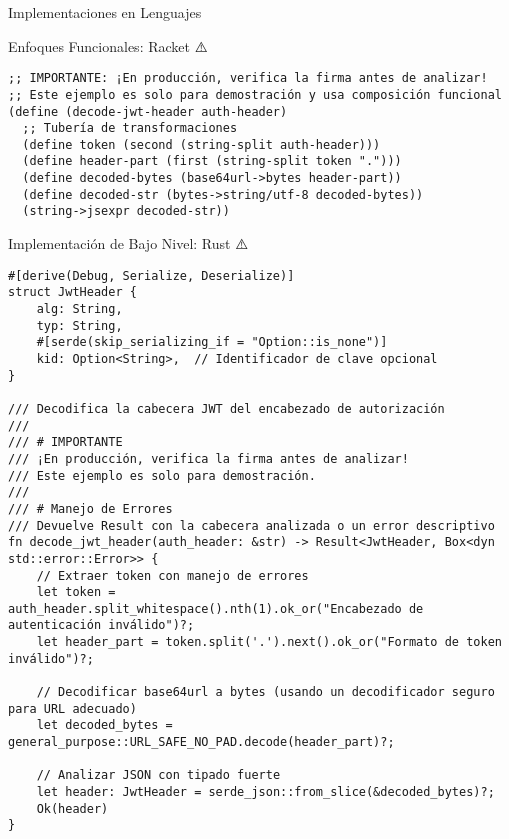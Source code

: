 \documentclass[presentation,aspectratio=169]{beamer}
\begin{document}
\begin{frame}[label={sec:orga7e0c44},fragile]{Implementaciones en Lenguajes}
\begin{block}{Enfoques Funcionales: Racket ⚠️}
\begin{verbatim}
;; IMPORTANTE: ¡En producción, verifica la firma antes de analizar!
;; Este ejemplo es solo para demostración y usa composición funcional
(define (decode-jwt-header auth-header)
  ;; Tubería de transformaciones
  (define token (second (string-split auth-header)))
  (define header-part (first (string-split token ".")))
  (define decoded-bytes (base64url->bytes header-part))
  (define decoded-str (bytes->string/utf-8 decoded-bytes))
  (string->jsexpr decoded-str))
\end{verbatim}
\end{block}
\begin{block}{Implementación de Bajo Nivel: Rust ⚠️}
\begin{verbatim}
#[derive(Debug, Serialize, Deserialize)]
struct JwtHeader {
    alg: String,
    typ: String,
    #[serde(skip_serializing_if = "Option::is_none")]
    kid: Option<String>,  // Identificador de clave opcional
}

/// Decodifica la cabecera JWT del encabezado de autorización
/// 
/// # IMPORTANTE
/// ¡En producción, verifica la firma antes de analizar!
/// Este ejemplo es solo para demostración.
/// 
/// # Manejo de Errores
/// Devuelve Result con la cabecera analizada o un error descriptivo
fn decode_jwt_header(auth_header: &str) -> Result<JwtHeader, Box<dyn std::error::Error>> {
    // Extraer token con manejo de errores
    let token = auth_header.split_whitespace().nth(1).ok_or("Encabezado de autenticación inválido")?;
    let header_part = token.split('.').next().ok_or("Formato de token inválido")?;

    // Decodificar base64url a bytes (usando un decodificador seguro para URL adecuado)
    let decoded_bytes = general_purpose::URL_SAFE_NO_PAD.decode(header_part)?;

    // Analizar JSON con tipado fuerte
    let header: JwtHeader = serde_json::from_slice(&decoded_bytes)?;
    Ok(header)
}
\end{verbatim}
\end{block}
\end{frame}
\end{document}
